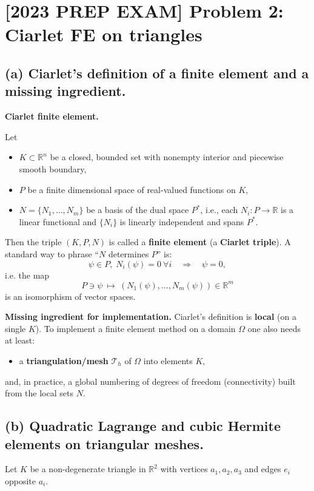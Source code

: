 
\section*{[2023 PREP EXAM] Problem 2: Ciarlet FE on triangles}
\subsection*{(a) Ciarlet's definition of a finite element and a missing ingredient.}

\textbf{Ciarlet finite element.}

Let
\begin{itemize}
    \item $K \subset \mathbb{R}^n$ be a closed, bounded set with nonempty interior
          and piecewise smooth boundary,
    \item $P$ be a finite dimensional space of real-valued functions on $K$,
    \item $N = \{N_1,\dots,N_m\}$ be a basis of the dual space $P^\ast$, i.e., each
          $N_i : P \to \mathbb{R}$ is a linear functional and $\{N_i\}$ is linearly independent
          and spans $P^\ast$.
\end{itemize}
Then the triple $(K,P,N)$ is called a \textbf{finite element} (a \textbf{Ciarlet triple}).
A standard way to phrase ``$N$ determines $P$'' is:
\[
    \psi \in P,\; N_i(\psi) = 0 \ \forall i \quad \Longrightarrow \quad \psi = 0,
\]
i.e. the map
\[
    P \ni \psi \ \mapsto\ (N_1(\psi),\dots,N_m(\psi)) \in \mathbb{R}^m
\]
is an isomorphism of vector spaces.

\textbf{Missing ingredient for implementation.}
Ciarlet's definition is \textbf{local} (on a single $K$).
To implement a finite element method on a domain $\Omega$ one also needs at least:

\begin{itemize}
    \item a \textbf{triangulation/mesh} $\mathcal{T}_h$ of $\Omega$ into elements $K$,
\end{itemize}

and, in practice, a global numbering of degrees of freedom (connectivity) built from
the local sets $N$.

\subsection*{(b) Quadratic Lagrange and cubic Hermite elements on triangular meshes.}

Let $K$ be a non-degenerate triangle in $\mathbb{R}^2$ with vertices
$a_1,a_2,a_3$ and edges $e_i$ opposite $a_i$.

